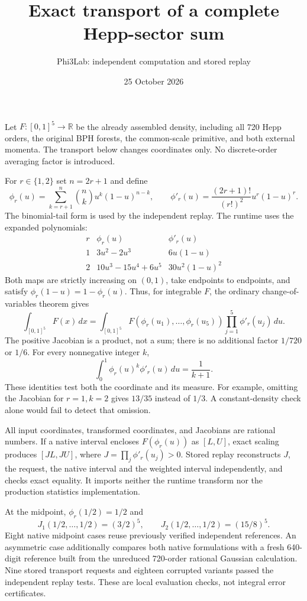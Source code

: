 \documentclass[11pt]{article}
\title{Exact transport of a complete Hepp-sector sum}
\author{Phi3Lab: independent computation and stored replay}
\date{25 October 2026}
\begin{document}
\maketitle
Let $F:[0,1]^5\to\mathbb R$ be the already assembled density, including
all 720 Hepp orders, the original BPH forests, the common-scale
primitive, and both external momenta. The transport below changes
coordinates only. No discrete-order averaging factor is introduced.

For $r\in\{1,2\}$ set $n=2r+1$ and define
\[
 \phi_r(u)=\sum_{k=r+1}^{n}\binom nk u^k(1-u)^{n-k},
 \qquad
 \phi'_r(u)=\frac{(2r+1)!}{(r!)^2}u^r(1-u)^r .
\]
The binomial-tail form is used by the independent replay. The runtime
uses the expanded polynomials:
\[
\begin{array}{c|c|c}
r&\phi_r(u)&\phi'_r(u)\\\hline
1&3u^2-2u^3&6u(1-u)\\
2&10u^3-15u^4+6u^5&30u^2(1-u)^2
\end{array}
\]
Both maps are strictly increasing on $(0,1)$, take endpoints to
endpoints, and satisfy $\phi_r(1-u)=1-\phi_r(u)$. Thus, for integrable
$F$, the ordinary change-of-variables theorem gives
\[
 \int_{[0,1]^5}F(x)\,dx
 =
 \int_{[0,1]^5}
 F\!\left(\phi_r(u_1),\ldots,\phi_r(u_5)\right)
 \prod_{j=1}^5\phi'_r(u_j)\,du .
\]
The positive Jacobian is a product, not a sum; there is no additional
factor $1/720$ or $1/6$. For every nonnegative integer $k$,
\[
 \int_0^1\phi_r(u)^k\phi'_r(u)\,du=\frac1{k+1}.
\]
These identities test both the coordinate and its measure. For example,
omitting the Jacobian for $r=1,k=2$ gives $13/35$ instead of $1/3$.
A constant-density check alone would fail to detect that omission.

All input coordinates, transformed coordinates, and Jacobians are
rational numbers. If a native interval encloses $F(\phi_r(u))$ as
$[L,U]$, exact scaling produces $[JL,JU]$, where
$J=\prod_j\phi'_r(u_j)>0$. Stored replay reconstructs $J$, the request,
the native interval and the weighted interval independently, and checks
exact equality. It imports neither the runtime transform nor the
production statistics implementation.

At the midpoint, $\phi_r(1/2)=1/2$ and
\[
 J_1(1/2,\ldots,1/2)=(3/2)^5,\qquad
 J_2(1/2,\ldots,1/2)=(15/8)^5.
\]
Eight native midpoint cases reuse previously verified independent
references. An asymmetric case additionally compares both native
formulations with a fresh 640-digit reference built from the unreduced
720-order rational Gaussian calculation. Nine stored transport requests
and eighteen corrupted variants passed the independent replay tests.
These are local evaluation checks, not integral error certificates.
\end{document}

